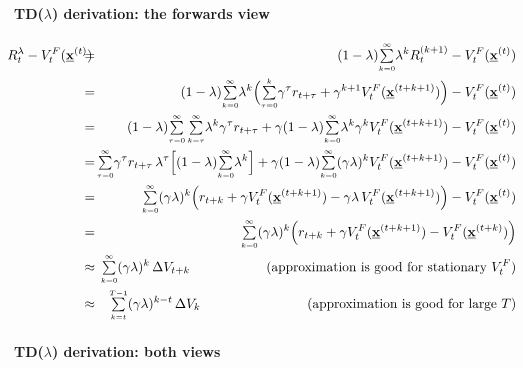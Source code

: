 \paragraph{TD($\lambda$) derivation: the forwards view}
	\vspace{-4mm}
	\begin{eqnarray*}\hspace{-2mm}
		R_t^\lambda - V_t^F(\vec x^{(t)}) \kern-2ex
		&=&\kern-2ex
			(1-\lambda) \smallsum{k=0}{\infty} \lambda^k R_t^{(k+1)} 
			- V_t^F(\vec x^{(t)})\\
		&=&\kern-2ex 
			(1-\lambda) \smallsum{k=0}{\infty} \lambda^k 
			\Big( \smallsum{\tau=0}{k} \gamma^\tau r_{t+\tau} 
				+ \gamma^{k+1} V_t^F(\vec x^{(t+k+1)}) \Big)
			- V_t^F(\vec x^{(t)}) \\
		&=&\kern-2ex 
			(1-\lambda) \smallsum{\tau=0}{\infty} \, \smallsum{k=\tau}{\infty} 
			\lambda^k \gamma^\tau r_{t+\tau} 
			+ \gamma (1-\lambda) \smallsum{k=0}{\infty} \lambda^k \gamma^{k} 
				V_t^F(\vec x^{(t+k+1)}) 
			- V_t^F(\vec x^{(t)}) \\
		&=&\kern-2ex 
			\smallsum{\tau=0}{\infty} \gamma^\tau r_{t+\tau} \, \lambda^\tau
			\Big[(1-\lambda) \smallsum{k=0}{\infty} \lambda^k \Big]
			+ \gamma (1-\lambda) \smallsum{k=0}{\infty} (\gamma \lambda)^{k} 
				V_t^F(\vec x^{(t+k+1)}) 
			- V_t^F(\vec x^{(t)}) \\
		&=&\kern-2ex 
			\smallsum{k=0}{\infty} (\gamma\lambda)^k 
			\Big( r_{t+k} + \gamma V_t^F(\vec x^{(t+k+1)}) 
				- \gamma\lambda \, V_t^F(\vec x^{(t+k+1)}) \Big)
			- V_t^F(\vec x^{(t)}) \\
		&=&\kern-2ex 
			\smallsum{k=0}{\infty} (\gamma\lambda)^k 
			\Big( r_{t+k} + \gamma V_t^F(\vec x^{(t+k+1)}) 
				- V_t^F(\vec x^{(t+k)}) \Big) \\
		&\approx&\kern-2ex 
			\smallsum{k=0}{\infty} (\gamma\lambda)^k \, \Delta V_{t+k}
			\hspace{20mm}\text{(approximation is good for stationary $V_t^F$)} \\
		&\approx&\kern-2ex 
			\smallsum{k=t}{T-1} (\gamma\lambda)^{k-t} \, \Delta V_{k}
			\hspace{28mm}\text{(approximation is good for large  $T$)}
	\end{eqnarray*}

\paragraph{TD($\lambda$) derivation: both views}

